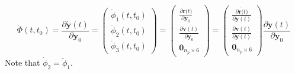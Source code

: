 \begin{equation}\label{eq:tapleyg22}
  \dot{\Phi}(t,t_0) = \frac{\partial \dot{\bm{y}}(t)}{\partial \bm{y}_0} = 
    \begin{pmatrix}
      \dot{\phi} _1 (t,t_0) \\ \dot{\phi} _2 (t,t_0) \\ \dot{\phi} _3 (t,t_0) \end{pmatrix}
    = \begin{pmatrix}
      \frac{\partial \dot{\bm{r}(}t)}{\partial \bm{y}_0} \\
      \frac{\partial \dot{\bm{v}}(t)}{\partial \bm{y}_0} \\
      \bm{0}_{n_p \times 6} \end{pmatrix}
    = \begin{pmatrix}
      \frac{\partial \dot{\bm{r}(}t)}{\partial \bm{y}(t)} \\
      \frac{\partial \dot{\bm{v}}(t)}{\partial \bm{y}(t)} \\
      \bm{0}_{n_p \times 6} \end{pmatrix} \frac{\partial \bm{y}(t)}{\partial \bm{y}_0}
\end{equation}
Note that $\dot{\phi} _2 = \ddot{\phi} _1$.

